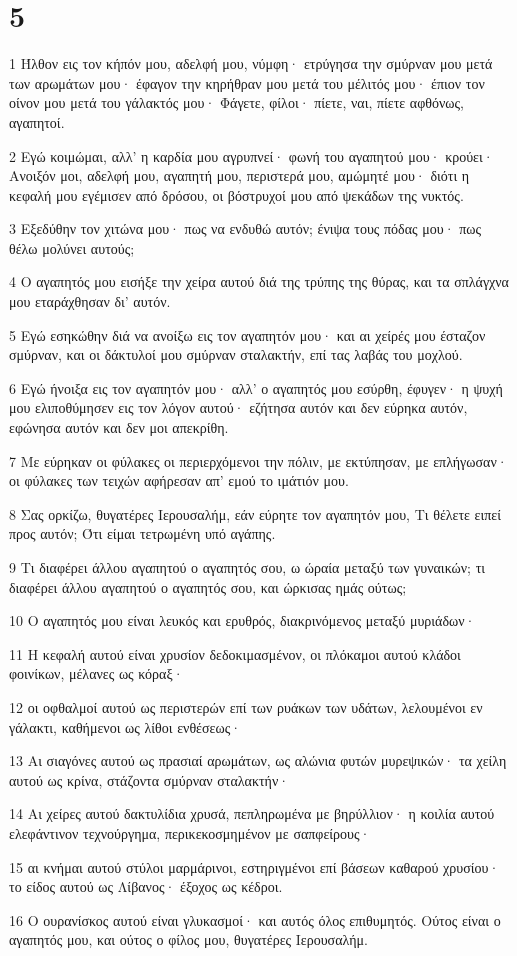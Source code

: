 \chapter{5}

\par 1 Ήλθον εις τον κήπόν μου, αδελφή μου, νύμφη· ετρύγησα την σμύρναν μου μετά των αρωμάτων μου· έφαγον την κηρήθραν μου μετά του μέλιτός μου· έπιον τον οίνον μου μετά του γάλακτός μου· Φάγετε, φίλοι· πίετε, ναι, πίετε αφθόνως, αγαπητοί.
\par 2 Εγώ κοιμώμαι, αλλ' η καρδία μου αγρυπνεί· φωνή του αγαπητού μου· κρούει· Ανοιξόν μοι, αδελφή μου, αγαπητή μου, περιστερά μου, αμώμητέ μου· διότι η κεφαλή μου εγέμισεν από δρόσου, οι βόστρυχοί μου από ψεκάδων της νυκτός.
\par 3 Εξεδύθην τον χιτώνα μου· πως να ενδυθώ αυτόν; ένιψα τους πόδας μου· πως θέλω μολύνει αυτούς;
\par 4 Ο αγαπητός μου εισήξε την χείρα αυτού διά της τρύπης της θύρας, και τα σπλάγχνα μου εταράχθησαν δι' αυτόν.
\par 5 Εγώ εσηκώθην διά να ανοίξω εις τον αγαπητόν μου· και αι χείρές μου έσταζον σμύρναν, και οι δάκτυλοί μου σμύρναν σταλακτήν, επί τας λαβάς του μοχλού.
\par 6 Εγώ ήνοιξα εις τον αγαπητόν μου· αλλ' ο αγαπητός μου εσύρθη, έφυγεν· η ψυχή μου ελιποθύμησεν εις τον λόγον αυτού· εζήτησα αυτόν και δεν εύρηκα αυτόν, εφώνησα αυτόν και δεν μοι απεκρίθη.
\par 7 Με εύρηκαν οι φύλακες οι περιερχόμενοι την πόλιν, με εκτύπησαν, με επλήγωσαν· οι φύλακες των τειχών αφήρεσαν απ' εμού το ιμάτιόν μου.
\par 8 Σας ορκίζω, θυγατέρες Ιερουσαλήμ, εάν εύρητε τον αγαπητόν μου, Τι θέλετε ειπεί προς αυτόν; Ότι είμαι τετρωμένη υπό αγάπης.
\par 9 Τι διαφέρει άλλου αγαπητού ο αγαπητός σου, ω ώραία μεταξύ των γυναικών; τι διαφέρει άλλου αγαπητού ο αγαπητός σου, και ώρκισας ημάς ούτως;
\par 10 Ο αγαπητός μου είναι λευκός και ερυθρός, διακρινόμενος μεταξύ μυριάδων·
\par 11 Η κεφαλή αυτού είναι χρυσίον δεδοκιμασμένον, οι πλόκαμοι αυτού κλάδοι φοινίκων, μέλανες ως κόραξ·
\par 12 οι οφθαλμοί αυτού ως περιστερών επί των ρυάκων των υδάτων, λελουμένοι εν γάλακτι, καθήμενοι ως λίθοι ενθέσεως·
\par 13 Αι σιαγόνες αυτού ως πρασιαί αρωμάτων, ως αλώνια φυτών μυρεψικών· τα χείλη αυτού ως κρίνα, στάζοντα σμύρναν σταλακτήν·
\par 14 Αι χείρες αυτού δακτυλίδια χρυσά, πεπληρωμένα με βηρύλλιον· η κοιλία αυτού ελεφάντινον τεχνούργημα, περικεκοσμημένον με σαπφείρους·
\par 15 αι κνήμαι αυτού στύλοι μαρμάρινοι, εστηριγμένοι επί βάσεων καθαρού χρυσίου· το είδος αυτού ως Λίβανος· έξοχος ως κέδροι.
\par 16 Ο ουρανίσκος αυτού είναι γλυκασμοί· και αυτός όλος επιθυμητός. Ούτος είναι ο αγαπητός μου, και ούτος ο φίλος μου, θυγατέρες Ιερουσαλήμ.

